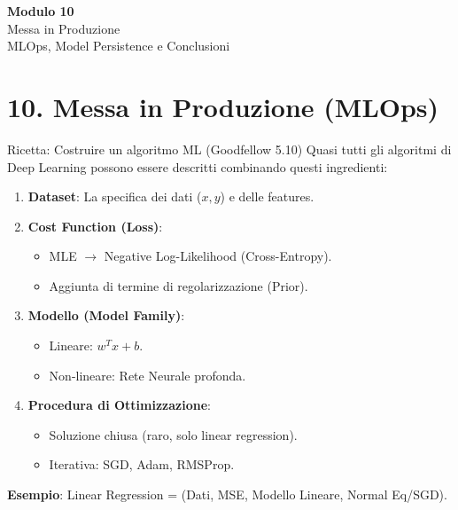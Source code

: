 \documentclass[aspectratio=169, 10pt]{beamer}
\begin{document}

\begin{frame}[plain]
    \centering
    \vspace{2cm}
    {\Huge \textbf{Modulo 10}}\\[0.5cm]
    {\Huge \textcolor{Accent}{Messa in Produzione}}\\[1cm]
    {\large MLOps, Model Persistence e Conclusioni}
\end{frame}

\section{10. Messa in Produzione (MLOps)}

\begin{frame}{Ricetta: Costruire un algoritmo ML (Goodfellow 5.10)}
    Quasi tutti gli algoritmi di Deep Learning possono essere descritti combinando questi ingredienti:
    
    \begin{enumerate}
        \item \textbf{Dataset}: La specifica dei dati ($x, y$) e delle features.
        \item \textbf{Cost Function (Loss)}: 
        \begin{itemize}
            \item MLE $\to$ Negative Log-Likelihood (Cross-Entropy).
            \item Aggiunta di termine di regolarizzazione (Prior).
        \end{itemize}
        \item \textbf{Modello (Model Family)}:
        \begin{itemize}
            \item Lineare: $w^T x + b$.
            \item Non-lineare: Rete Neurale profonda.
        \end{itemize}
        \item \textbf{Procedura di Ottimizzazione}:
        \begin{itemize}
            \item Soluzione chiusa (raro, solo linear regression).
            \item Iterativa: SGD, Adam, RMSProp.
        \end{itemize}
    \end{enumerate}
    
    \vspace{0.5em}
    \small \textbf{Esempio}: Linear Regression = (Dati, MSE, Modello Lineare, Normal Eq/SGD).
\end{frame}
\end{document}
